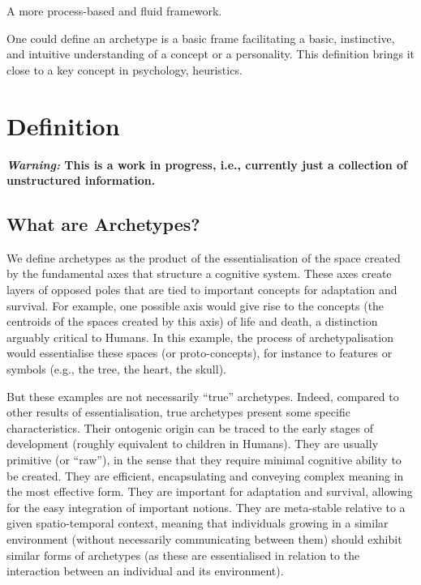 \documentclass[
]{book}
\begin{document}
A more process-based and fluid framework.

One could define an archetype is a basic frame facilitating a basic, instinctive, and intuitive understanding of a concept or a personality. This definition brings it close to a key concept in psychology, heuristics.

\hypertarget{definition}{%
\chapter{Definition}\label{definition}}

\textbf{\emph{Warning:} This is a work in progress, i.e., currently just a collection of unstructured information.}

\hypertarget{what-are-archetypes}{%
\section{What are Archetypes?}\label{what-are-archetypes}}

We define archetypes as the product of the essentialisation of the space created by the fundamental axes that structure a cognitive system. These axes create layers of opposed poles that are tied to important concepts for adaptation and survival. For example, one possible axis would give rise to the concepts (the centroids of the spaces created by this axis) of life and death, a distinction arguably critical to Humans. In this example, the process of archetypalisation would essentialise these spaces (or proto-concepts), for instance to features or symbols (e.g., the tree, the heart, the skull).

But these examples are not necessarily ``true'' archetypes. Indeed, compared to other results of essentialisation, true archetypes present some specific characteristics. Their ontogenic origin can be traced to the early stages of development (roughly equivalent to children in Humans). They are usually primitive (or ``raw''), in the sense that they require minimal cognitive ability to be created. They are efficient, encapsulating and conveying complex meaning in the most effective form. They are important for adaptation and survival, allowing for the easy integration of important notions. They are meta-stable relative to a given spatio-temporal context, meaning that individuals growing in a similar environment (without necessarily communicating between them) should exhibit similar forms of archetypes (as these are essentialised in relation to the interaction between an individual and its environment).
\end{document}
